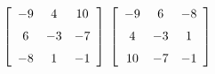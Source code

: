 {$\left[ \begin {array}{ccc} -9&4&10\\\noalign{\medskip}6&-3&-7
\\\noalign{\medskip}-8&1&-1\end {array} \right]$}
{$ \left[ \begin {array}{ccc} -9&6&-8\\\noalign{\medskip}4&-3&1
\\\noalign{\medskip}10&-7&-1\end {array} \right]$}

